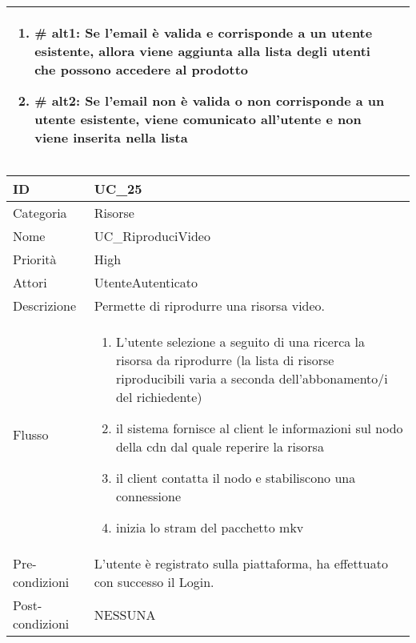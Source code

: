 \begin{center}
\begin{tabular}{ |p{2cm}|p{13cm}|  }
\begin{enumerate}
\begin{enumerate}[  ]
\begin{enumerate}[label*=\arabic*.]
							\begin{enumerate}[label*=\arabic*.]
								\item \textbf{\# alt1:} Se l'email è valida e corrisponde a un utente esistente, allora viene aggiunta alla lista degli utenti che possono accedere al prodotto
								\item \textbf{\# alt2:} Se l'email non è valida o non corrisponde a un utente esistente, viene comunicato all'utente e non viene inserita nella lista
							\end{enumerate}
					\end{enumerate}
				\end{enumerate}
		\end{enumerate}\\\hline
\end{tabular}
\label{table_use_case:24}\newline


\begin{tabular}{ |p{2cm}|p{13cm}|  }
\hline
ID & UC\_25 \\\hline
Categoria & Risorse\\\hline
Nome & UC\_RiproduciVideo\\\hline
Priorità & High \\\hline
Attori &  UtenteAutenticato \\\hline
Descrizione & Permette di riprodurre una risorsa video.\\\hline
Flusso &  	\begin{enumerate}
			\item L'utente selezione a seguito di una ricerca la risorsa da riprodurre (la lista di risorse riproducibili varia a seconda dell'abbonamento/i del richiedente)
			\item il sistema fornisce al client le informazioni sul nodo della cdn dal quale reperire la risorsa 
			\item il client contatta il nodo e stabiliscono una connessione
			\item inizia lo stram del pacchetto mkv 
			\end{enumerate}
			\\\hline
Pre-condizioni & L'utente è registrato sulla piattaforma, ha effettuato con successo il Login.\\\hline
Post-condizioni & NESSUNA\\\hline
\end{tabular}
\label{table_use_case:25}\newline


\end{center}
